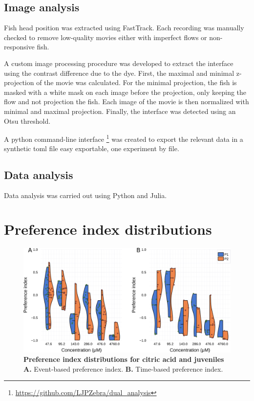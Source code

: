 \begin{appendices}
    \section{Image analysis}
    Fish head position was extracted using FastTrack. Each recording was manually checked to remove low-quality movies either with imperfect flows or non-responsive fish.

    A custom image processing procedure was developed to extract the interface using the contrast difference due to the dye. First, the maximal and minimal z-projection of the movie was calculated. For the minimal projection, the fish is masked with a white mask on each image before the projection, only keeping the flow and not projection the fish. Each image of the movie is then normalized with minimal and maximal projection. Finally, the interface was detected using an Otsu threshold.

    A python command-line interface \footnote{\url{https://github.com/LJPZebra/dual_analysis}} was created to export the relevant data in a synthetic toml file easy exportable, one experiment by file.

    \section{Data analysis}
    Data analysis was carried out using Python and Julia.


  \chapter{Preference index distributions}

    \begin{figure}[h]
      \centering
      \includegraphics[width=1\textwidth]{part_2/assets/dist_acid.png}
      \caption{\textbf{Preference index distributions for citric acid and juveniles} \textbf{A.} Event-based preference index. \textbf{B.} Time-based preference index. }
      \label{dist_citric_acid}
    \end{figure}


\end{appendices}
